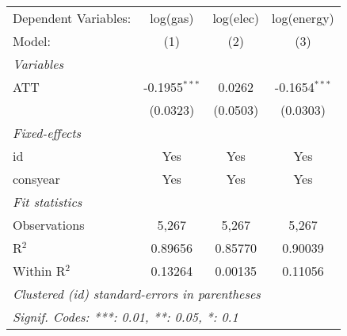 
\begin{tabular}{lccc}
   \tabularnewline\midrule\midrule
   Dependent Variables: & log(gas)        & log(elec) & log(energy)\\
   Model:               & (1)             & (2)       & (3)\\
   \midrule \emph{Variables} &   &   &  \\
   ATT                  & -0.1955$^{***}$ & 0.0262    & -0.1654$^{***}$\\
                        & (0.0323)        & (0.0503)  & (0.0303)\\
   \midrule \emph{Fixed-effects} &   &   &  \\
   id                   & Yes             & Yes       & Yes\\
   consyear             & Yes             & Yes       & Yes\\
   \midrule \emph{Fit statistics} &   &   &  \\
   Observations         & 5,267           & 5,267     & 5,267\\
   R$^2$                & 0.89656         & 0.85770   & 0.90039\\
   Within R$^2$         & 0.13264         & 0.00135   & 0.11056\\
   \midrule\midrule\multicolumn{4}{l}{\emph{Clustered (id) standard-errors in parentheses}}\\
   \multicolumn{4}{l}{\emph{Signif. Codes: ***: 0.01, **: 0.05, *: 0.1}}\\
\end{tabular}


